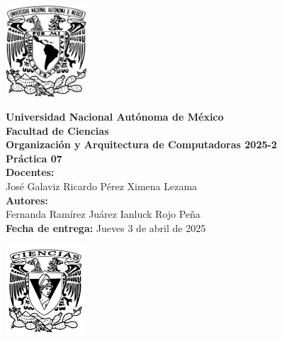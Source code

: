 \documentclass[12pt,letterpaper]{article}
\begin{document}
\begin{center}
\newcommand{\imp}{\rightarrow}
\newcommand{\vp}{\varphi}
  \begin{minipage}{3cm}
    \begin{center}
      \includegraphics[height=3.4cm]{../unam_logo.png}
    \end{center}
  \end{minipage}\hfill
  \begin{minipage}{10cm}
    \begin{center}
      \textbf{\Large Universidad Nacional Autónoma de México}\\[0.2cm]
      \textbf{\large Facultad de Ciencias}\\[0.2cm]
      \textbf{Organización y Arquitectura de Computadoras 2025-2}\\[0.4cm]
      \textbf{\Large Práctica 07}\\[0.1cm]
      \textbf{Docentes:}\\
      José Galaviz \hspace{1em} Ricardo Pérez \hspace{1em} Ximena Lezama\\[0.3cm]
      \textbf{Autores:}\\
      Fernanda Ramírez Juárez \quad Ianluck Rojo Peña\\[0.3cm]
      \textbf{Fecha de entrega:} Jueves 3 de abril de 2025
    \end{center}
  \end{minipage}\hfill
  \begin{minipage}{3cm}
    \begin{center}
      \includegraphics[height=3.4cm]{../fc_logo.png}
    \end{center}
  \end{minipage}
\end{center}
\end{document}
